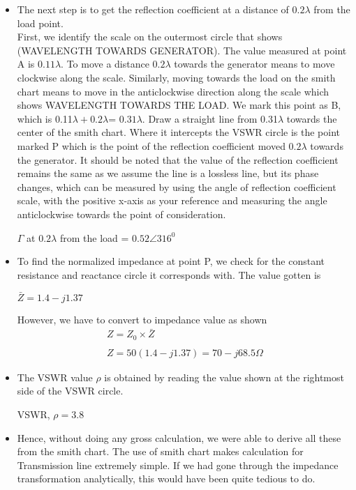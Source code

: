 \begin{itemize}
	\item 
	The next step is to get the reflection coefficient at a distance of $0.2\lambda$ from the load point.\\
	First, we identify the scale on the outermost circle that shows (WAVELENGTH TOWARDS GENERATOR). The value measured at point A is $0.11\lambda$. To move a distance $0.2\lambda$ towards the generator means to move clockwise along the scale. Similarly, moving towards the load on the smith chart means to move in the anticlockwise direction along the scale which shows WAVELENGTH TOWARDS THE LOAD. We mark this point as B, which is 0.11$\lambda + 0.2\lambda$= $0.31\lambda$. Draw a straight line from 0.31$\lambda$ towards the center of the smith chart. Where it intercepts the VSWR circle is the point marked P which is the point of the reflection coefficient moved $0.2\lambda$ towards the generator. It should be noted that the value of the reflection coefficient remains the same as we assume the line is a lossless line, but its phase changes, which can be measured by using the angle of reflection coefficient scale, with the positive x-axis as your reference and measuring the angle anticlockwise towards the point of consideration. 
	
	\begin{center}
		$\Gamma$ at $0.2\lambda$ from the load  = $0.52\angle316^{0}$
	\end{center}
	
	\item
	To find the normalized impedance at point P, we check for the constant resistance and reactance circle  it corresponds with. The value gotten is 
	\begin{center}
		$\bar{Z}=1.4-j1.37$
	\end{center}
	However, we have to convert to impedance value as shown
    \begin{align*}
    Z=Z_{0}\times\bar{Z}\\\\
    Z= 50(1.4-j1.37) = 70-j68.5\Omega
    \end{align*}
	
	\item
	The VSWR value $\rho$ is obtained by reading the value shown at the rightmost side of the VSWR circle.
	
    \begin{center}
    		VSWR, $\rho = 3.8$
    \end{center}
	
	\item 
	Hence, without doing any gross calculation, we were able to derive all these from the smith chart. The use of smith chart makes calculation for Transmission line extremely simple. If we had gone through the impedance transformation analytically, this would have been quite tedious to do.
\end{itemize}

